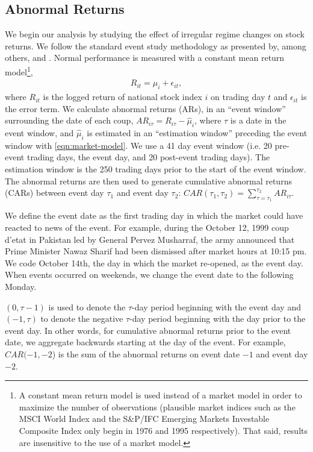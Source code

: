 \documentclass[12pt,final,fleqn]{article}
\theoremstyle{plain}
\begin{document}
\subsection{Abnormal Returns} \label{subsec: Abnormal Returns}
We begin our analysis by studying the effect of irregular regime changes on stock returns. We follow the standard event study methodology as presented by, among others, \citep{mackinlay1997event} and \citep{campbell1997econometrics}. Normal performance is measured with a constant mean return model\footnote{A constant mean return model is used instead of a market model in order to maximize the number of observations (plausible market indices such as the MSCI World Index and the S\&P/IFC Emerging Markets Investable Composite Index only begin in 1976 and 1995 respectively). That said, results are insensitive to the use of a market model.},
\begin{align} \label{eqn:market-model}
R_{it}=\mu_{i}+\epsilon_{it},
\end{align}
where $R_{it}$ is the logged return of national stock index $i$ on trading day $t$ and $\epsilon_{it}$ is the error term. We calculate abnormal returns (ARs), in an ``event window'' surrounding the date of each coup, $AR_{i\tau}=R_{i\tau}-\widehat{\mu}_i$, where $\tau$ is a date in the event window, and $\widehat{\mu}_i$ is estimated in an ``estimation window'' preceding the event window with \autoref{eqn:market-model}. We use a 41 day event window (i.e. 20 pre-event trading days, the event day, and 20 post-event trading days). The estimation window is the 250 trading days prior to the start of the event window. The abnormal returns are then used to generate cumulative abnormal returns (CARs) between event day $\tau_1$ and event day $\tau_2$: $CAR(\tau_1,\tau_2)=\sum_{\tau=\tau_1}^{\tau_2}AR_{i\tau}$.

We define the event date as the first trading day in which the market could have reacted to news of the event. For example, during the October 12, 1999 coup d'etat in Pakistan led by General Pervez Musharraf, the army announced that Prime Minister Nawaz Sharif had been dismissed after market hours at 10:15 pm. We code October 14th, the day in which the market re-opened, as the event day. When events occurred on weekends, we change the event date to the following Monday.

$(0,\tau-1)$ is used to denote the $\tau$-day period beginning with the event day and $(-1,\tau)$ to denote the negative $\tau$-day period beginning with the day prior to the event day. In other words, for cumulative abnormal returns prior to the event date, we aggregate backwards starting at the day of the event. For example, $CAR(-1,-2$) is the sum of the abnormal returns on event date $-1$ and event day $-2$.
\end{document}
